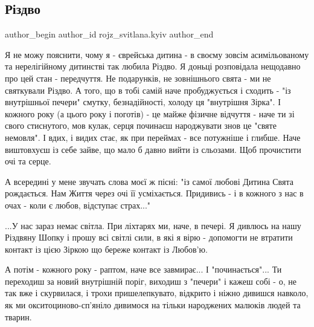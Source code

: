  
 
 
 
 

\subsection{Різдво}
\label{sec:06_01_2023.fb.rojz_svitlana.kyiv.1.r_zdvo}

\ifcmt
 author_begin
   author_id rojz_svitlana.kyiv
 author_end
\fi

Я не можу пояснити, чому я - єврейська дитина - в своєму зовсім асимільованому
та нерелігійному дитинстві так любила Різдво. Я доньці розповідала нещодавно
про цей стан - передчуття. Не подарунків, не зовнішнього свята - ми не
святкували Різдво. А того, що в тобі самій наче пробуджується і сходить - "із
внутрішньої печери" смутку, безнадійності, холоду ця "внутрішня Зірка". І
кожного року (а цього року і поготів) - це майже фізичне відчуття - наче ти зі
свого стиснутого, мов кулак, серця починаєш народжувати знов це "святе
немовля".  І вдих, і видих  стає, як при переймах - все потужніше і глибше.
Наче виштовхуєш із себе зайве, що мало б давно вийти із сльозами. Щоб
прочистити очі та серце.

А всередині у мене звучать слова моєї ж пісні: "із самої любові Дитина Свята
рождається. Нам Життя через очі її усміхається. Придивись - і в кожного з нас в
очах - коли є любов, відступає страх..."

...У нас зараз немає світла. При ліхтарях ми, наче, в печері. Я дивлюсь на нашу
Різдвяну Шопку і прошу всі світлі сили, в які я вірю - допомогти не втратити
контакт із цією Зіркою що береже контакт із Любов'ю. 

А потім - кожного року - раптом, наче все завмирає... І "починається"... Ти
переходиш за новий внутрішній поріг, виходиш з "печери" і кажеш собі - о, не
так вже і скурвилася, і трохи пришелепкувато, відкрито  і ніжно дивишся
навколо, як ми окситоциново-сп'яніло дивимося на тільки народжених малюків
людей та тварин.

